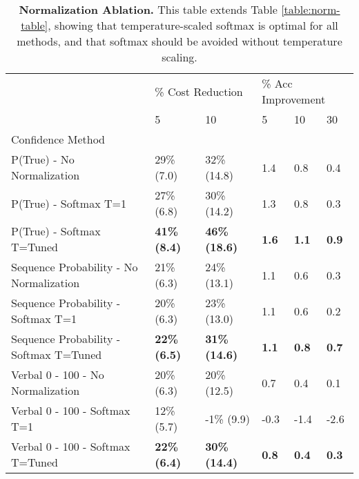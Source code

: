 \begin{table*}[!h]
\centering
\begin{tabular}{llllll}
\toprule
 & \multicolumn{2}{l}{\% Cost Reduction} & \multicolumn{3}{l}{\% Acc Improvement} \\
 & 5 & 10 & 5 & 10 & 30 \\
Confidence Method &  &  &  &  &  \\
\midrule
P(True) - No Normalization & 29\% \small{(7.0)} & 32\% \small{(14.8)} & 1.4 & 0.8 & 0.4 \\
P(True) - Softmax T=1 & 27\% \small{(6.8)} & 30\% \small{(14.2)} & 1.3 & 0.8 & 0.3 \\
P(True) - Softmax T=Tuned & \textbf{41\% \small{(8.4)}} & \textbf{46\% \small{(18.6)}} & \textbf{1.6} & \textbf{1.1} & \textbf{0.9} \\
\midrule
Sequence Probability - No Normalization & 21\% \small{(6.3)} & 24\% \small{(13.1)} & 1.1 & 0.6 & 0.3 \\
Sequence Probability - Softmax T=1 & 20\% \small{(6.3)} & 23\% \small{(13.0)} & 1.1 & 0.6 & 0.2 \\
Sequence Probability - Softmax T=Tuned & \textbf{22\% \small{(6.5)}} & \textbf{31\% \small{(14.6)}} & \textbf{1.1} & \textbf{0.8} & \textbf{0.7} \\
\midrule
Verbal 0 - 100 - No Normalization & 20\% \small{(6.3)} & 20\% \small{(12.5)} & 0.7 & 0.4 & 0.1 \\
Verbal 0 - 100 - Softmax T=1 & 12\% \small{(5.7)} & -1\% \small{(9.9)} & -0.3 & -1.4 & -2.6 \\
Verbal 0 - 100 - Softmax T=Tuned & \textbf{22\% \small{(6.4)}} & \textbf{30\% \small{(14.4)}} & \textbf{0.8} & \textbf{0.4} & \textbf{0.3} \\
\bottomrule
\end{tabular}
\caption{\textbf{Normalization Ablation. } This table extends Table \ref{table:norm-table}, showing that temperature-scaled softmax is optimal for all methods, and that softmax should be avoided without temperature scaling. }
\label{table:norm-table-ext}
\end{table*}

